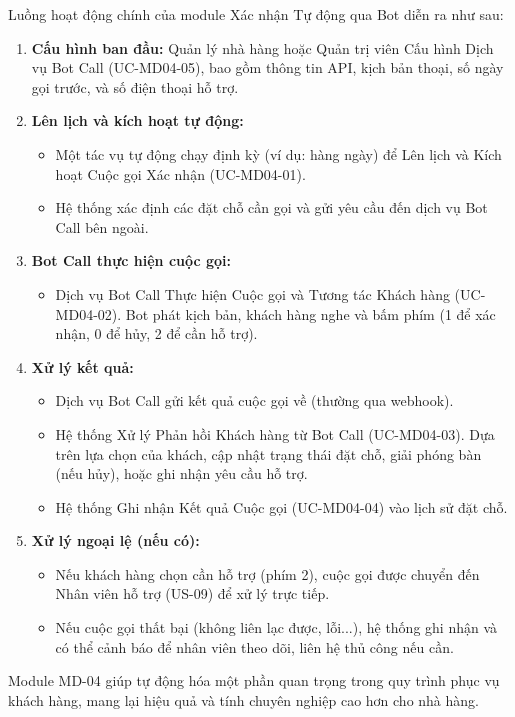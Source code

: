 \label{sssec:md04_overall_workflow}
Luồng hoạt động chính của module Xác nhận Tự động qua Bot diễn ra như sau:
\begin{enumerate}
    \item \textbf{Cấu hình ban đầu:} Quản lý nhà hàng hoặc Quản trị viên Cấu hình Dịch vụ Bot Call (UC-MD04-05), bao gồm thông tin API, kịch bản thoại, số ngày gọi trước, và số điện thoại hỗ trợ.
    \item \textbf{Lên lịch và kích hoạt tự động:}
        \begin{itemize}
            \item Một tác vụ tự động chạy định kỳ (ví dụ: hàng ngày) để Lên lịch và Kích hoạt Cuộc gọi Xác nhận (UC-MD04-01).
            \item Hệ thống xác định các đặt chỗ cần gọi và gửi yêu cầu đến dịch vụ Bot Call bên ngoài.
        \end{itemize}
    \item \textbf{Bot Call thực hiện cuộc gọi:}
        \begin{itemize}
            \item Dịch vụ Bot Call Thực hiện Cuộc gọi và Tương tác Khách hàng (UC-MD04-02). Bot phát kịch bản, khách hàng nghe và bấm phím (1 để xác nhận, 0 để hủy, 2 để cần hỗ trợ).
        \end{itemize}
    \item \textbf{Xử lý kết quả:}
        \begin{itemize}
            \item Dịch vụ Bot Call gửi kết quả cuộc gọi về (thường qua webhook).
            \item Hệ thống Xử lý Phản hồi Khách hàng từ Bot Call (UC-MD04-03). Dựa trên lựa chọn của khách, cập nhật trạng thái đặt chỗ, giải phóng bàn (nếu hủy), hoặc ghi nhận yêu cầu hỗ trợ.
            \item Hệ thống Ghi nhận Kết quả Cuộc gọi (UC-MD04-04) vào lịch sử đặt chỗ.
        \end{itemize}
    \item \textbf{Xử lý ngoại lệ (nếu có):}
        \begin{itemize}
            \item Nếu khách hàng chọn cần hỗ trợ (phím 2), cuộc gọi được chuyển đến Nhân viên hỗ trợ (US-09) để xử lý trực tiếp.
            \item Nếu cuộc gọi thất bại (không liên lạc được, lỗi...), hệ thống ghi nhận và có thể cảnh báo để nhân viên theo dõi, liên hệ thủ công nếu cần.
        \end{itemize}
\end{enumerate}
Module MD-04 giúp tự động hóa một phần quan trọng trong quy trình phục vụ khách hàng, mang lại hiệu quả và tính chuyên nghiệp cao hơn cho nhà hàng.

